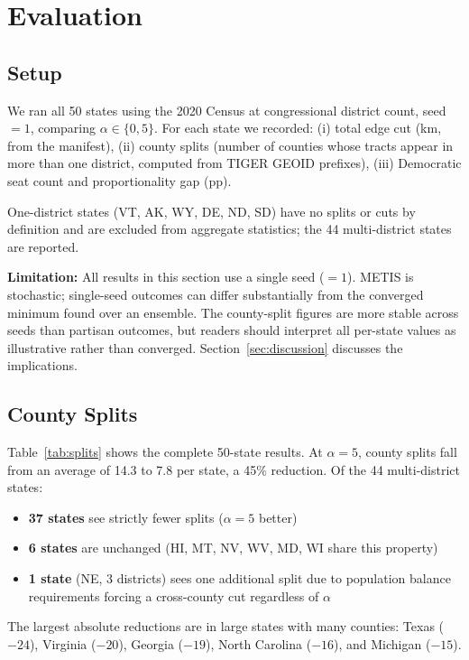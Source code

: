\section{Evaluation}
\label{sec:eval}

\subsection{Setup}

We ran all 50 states using the 2020 Census at congressional district count,
seed $= 1$, comparing $\alpha \in \{0, 5\}$.
For each state we recorded:
(i) total edge cut (km, from the manifest),
(ii) county splits (number of counties whose tracts appear in more than one district,
computed from TIGER GEOID prefixes),
(iii) Democratic seat count and proportionality gap (pp).

One-district states (VT, AK, WY, DE, ND, SD) have no splits or cuts by definition
and are excluded from aggregate statistics; the 44 multi-district states are reported.

\textbf{Limitation:} All results in this section use a single seed ($= 1$).
METIS is stochastic; single-seed outcomes can differ substantially from the
converged minimum found over an ensemble.
The county-split figures are more stable across seeds than partisan outcomes,
but readers should interpret all per-state values as illustrative rather than
converged.
Section~\ref{sec:discussion} discusses the implications.

\subsection{County Splits}

Table~\ref{tab:splits} shows the complete 50-state results.
At $\alpha = 5$, county splits fall from an average of 14.3 to 7.8 per state,
a 45\% reduction.
Of the 44 multi-district states:
\begin{itemize}
  \item \textbf{37 states} see strictly fewer splits ($\alpha = 5$ better)
  \item \textbf{6 states} are unchanged (HI, MT, NV, WV, MD, WI share this property)
  \item \textbf{1 state} (NE, 3 districts) sees one additional split due to population balance requirements forcing a cross-county cut regardless of $\alpha$
\end{itemize}

The largest absolute reductions are in large states with many counties:
Texas ($-24$), Virginia ($-20$), Georgia ($-19$), North Carolina ($-16$),
and Michigan ($-15$).

